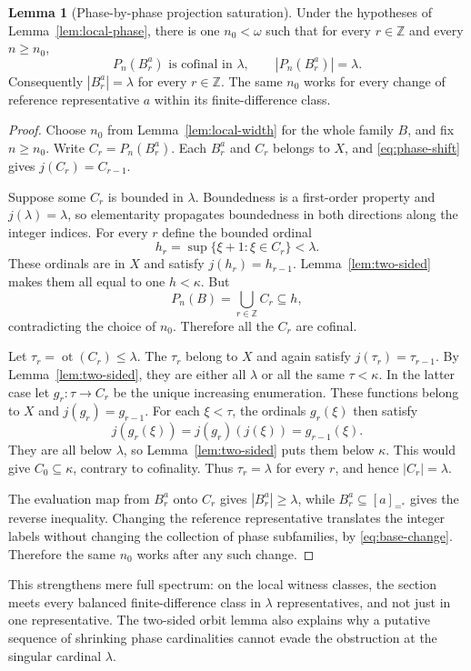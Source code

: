 \documentclass[11pt,letterpaper]{article}
\theoremstyle{definition}
\newtheorem{lemma}[definition]{Lemma}
\newcommand{\ot}{\operatorname{ot}}
\numberwithin{equation}{section}
\newcommand{\ZZ}{\mathbb Z}
\begin{document}
\begin{lemma}[Phase-by-phase projection saturation]\label{lem:phase-width}
Under the hypotheses of Lemma~\ref{lem:local-phase}, there is one $n_0<\omega$ such that for every $r\in\ZZ$ and every $n\ge n_0$,
\[
P_n(B_r^a)\text{ is cofinal in }\lambda,
\qquad |P_n(B_r^a)|=\lambda.
\]
Consequently $|B_r^a|=\lambda$ for every $r\in\ZZ$. The same $n_0$ works for every change of reference representative $a$ within its finite-difference class.
\end{lemma}
\begin{proof}
Choose $n_0$ from Lemma~\ref{lem:local-width} for the whole family $B$, and fix $n\ge n_0$. Write $C_r=P_n(B_r^a)$. Each $B_r^a$ and $C_r$ belongs to $X$, and \eqref{eq:phase-shift} gives $j(C_r)=C_{r-1}$.

Suppose some $C_r$ is bounded in $\lambda$. Boundedness is a first-order property and $j(\lambda)=\lambda$, so elementarity propagates boundedness in both directions along the integer indices. For every $r$ define the bounded ordinal
\[
h_r=\sup\{\xi+1:\xi\in C_r\}<\lambda.
\]
These ordinals are in $X$ and satisfy $j(h_r)=h_{r-1}$. Lemma~\ref{lem:two-sided} makes them all equal to one $h<\kappa$. But
\[
P_n(B)=\bigcup_{r\in\ZZ} C_r\subseteq h,
\]
contradicting the choice of $n_0$. Therefore all the $C_r$ are cofinal.

Let $\tau_r=\ot(C_r)\le\lambda$. The $\tau_r$ belong to $X$ and again satisfy $j(\tau_r)=\tau_{r-1}$. By Lemma~\ref{lem:two-sided}, they are either all $\lambda$ or all the same $\tau<\kappa$. In the latter case let $g_r:\tau\to C_r$ be the unique increasing enumeration. These functions belong to $X$ and $j(g_r)=g_{r-1}$. For each $\xi<\tau$, the ordinals $g_r(\xi)$ then satisfy
\[
j(g_r(\xi))=j(g_r)(j(\xi))=g_{r-1}(\xi).
\]
They are all below $\lambda$, so Lemma~\ref{lem:two-sided} puts them below $\kappa$. This would give $C_0\subseteq\kappa$, contrary to cofinality. Thus $\tau_r=\lambda$ for every $r$, and hence $|C_r|=\lambda$.

The evaluation map from $B_r^a$ onto $C_r$ gives $|B_r^a|\ge\lambda$, while $B_r^a\subseteq[a]_{=^{*}}$ gives the reverse inequality. Changing the reference representative translates the integer labels without changing the collection of phase subfamilies, by \eqref{eq:base-change}. Therefore the same $n_0$ works after any such change.
\end{proof}

This strengthens mere full spectrum: on the local witness classes, the section meets every balanced finite-difference class in $\lambda$ representatives, and not just in one representative. The two-sided orbit lemma also explains why a putative sequence of shrinking phase cardinalities cannot evade the obstruction at the singular cardinal $\lambda$.
\end{document}
